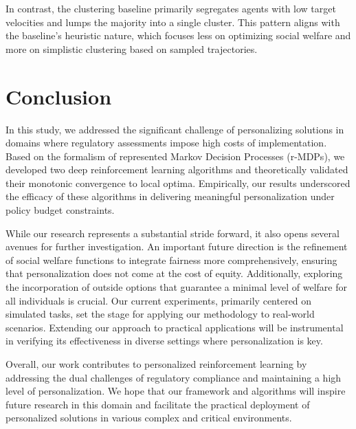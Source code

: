 \documentclass[letterpaper]{article} %
\begin{document}
In contrast, the clustering baseline primarily segregates agents with low target velocities and lumps the majority into a single cluster. This pattern aligns with the baseline's heuristic nature, which focuses less on optimizing social welfare and more on simplistic clustering based on sampled trajectories.


\section{Conclusion}
\label{sec:conclusion}



In this study, we addressed the significant challenge of personalizing solutions in domains where regulatory assessments impose high costs of implementation. Based on the formalism of represented Markov Decision Processes (r-MDPs), we developed two deep reinforcement learning algorithms and theoretically validated their monotonic convergence to local optima. Empirically, our results underscored the efficacy of these algorithms in delivering meaningful personalization under policy budget constraints.

While our research represents a substantial stride forward, it also opens several avenues for further investigation. An important future direction is the refinement of social welfare functions to integrate fairness more comprehensively, ensuring that personalization does not come at the cost of equity. Additionally, exploring the incorporation of outside options that guarantee a minimal level of welfare for all individuals is crucial. Our current experiments, primarily centered on simulated tasks, set the stage for applying our methodology to real-world scenarios. Extending our approach to practical applications will be instrumental in verifying its effectiveness in diverse settings where personalization is key.

Overall, our work contributes to personalized reinforcement learning by addressing the dual challenges of regulatory compliance and maintaining a high level of personalization. We hope that our framework and algorithms will inspire future research in this domain and facilitate the practical deployment of personalized solutions in various complex and critical environments.







\end{document}
